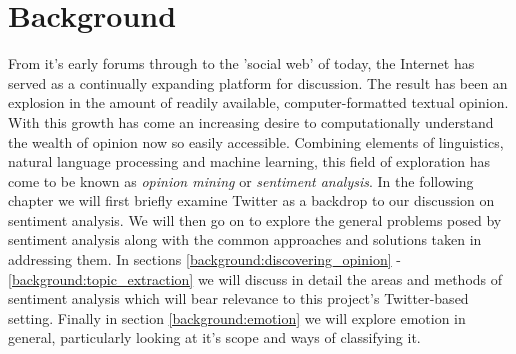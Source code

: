 

\chapter{Background}
\label{background}

From it's early forums through to the 'social web' of today, the Internet has served as a continually expanding platform for discussion. The result has been an explosion in the amount of readily available, computer-formatted textual opinion. With this growth has come an increasing desire to computationally understand the wealth of opinion now so easily accessible. Combining elements of linguistics, natural language processing and machine learning, this field of exploration has come to be known as \emph{opinion mining} or \emph{sentiment analysis}. In the following chapter we will first briefly examine Twitter as a backdrop to our discussion on sentiment analysis. We will then go on to explore the general problems posed by sentiment analysis along with the common approaches and solutions taken in addressing them. In sections \ref{background:discovering_opinion} - \ref{background:topic_extraction} we will discuss in detail the areas and methods of sentiment analysis which will bear relevance to this project's Twitter-based setting. Finally in section \ref{background:emotion} we will explore emotion in general, particularly looking at it's scope and ways of classifying it.

